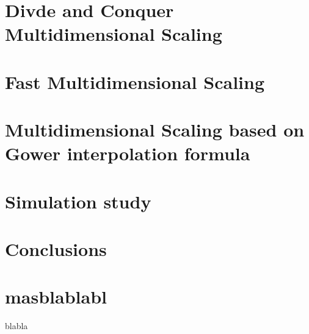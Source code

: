 \documentclass[11pt]{report}
\begin{document}
\chapter{Divde and Conquer Multidimensional Scaling}


\chapter{Fast Multidimensional Scaling}


\chapter{Multidimensional Scaling based on Gower interpolation formula}

\chapter{Simulation study}


\chapter{Conclusions}





\appendix 

\chapter{masblablabl}
blabla
\end{document}
